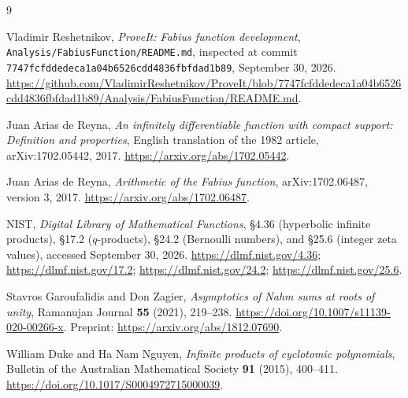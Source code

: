 \documentclass[11pt,a4paper]{article}
\numberwithin{equation}{section}
\theoremstyle{definition}
\theoremstyle{remark}
\begin{document}
\clearpage
\begin{thebibliography}{9}
\raggedright
{}
Vladimir Reshetnikov, \emph{ProveIt: Fabius function development},
\texttt{Analysis/FabiusFunction/README.md}, inspected at commit
\texttt{7747fcfddedeca1a04b6526cdd4836fbfdad1b89}, September 30, 2026.
\url{https://github.com/VladimirReshetnikov/ProveIt/blob/7747fcfddedeca1a04b6526cdd4836fbfdad1b89/Analysis/FabiusFunction/README.md}.

Juan Arias de Reyna, \emph{An infinitely differentiable function with compact support: Definition and properties}, English translation of the 1982 article, arXiv:1702.05442, 2017.
\url{https://arxiv.org/abs/1702.05442}.

Juan Arias de Reyna, \emph{Arithmetic of the Fabius function},
arXiv:1702.06487, version 3, 2017.
\url{https://arxiv.org/abs/1702.06487}.

NIST, \emph{Digital Library of Mathematical Functions},
\S4.36 (hyperbolic infinite products), \S17.2 (\(q\)-products),
\S24.2 (Bernoulli numbers), and \S25.6 (integer zeta values), accessed September 30, 2026.
\url{https://dlmf.nist.gov/4.36}; \url{https://dlmf.nist.gov/17.2};
\url{https://dlmf.nist.gov/24.2}; \url{https://dlmf.nist.gov/25.6}.

Stavros Garoufalidis and Don Zagier,
\emph{Asymptotics of Nahm sums at roots of unity},
Ramanujan Journal \textbf{55} (2021), 219--238.
\url{https://doi.org/10.1007/s11139-020-00266-x}.
Preprint: \url{https://arxiv.org/abs/1812.07690}.

William Duke and Ha Nam Nguyen,
\emph{Infinite products of cyclotomic polynomials},
Bulletin of the Australian Mathematical Society \textbf{91} (2015), 400--411.
\url{https://doi.org/10.1017/S0004972715000039}.
\end{thebibliography}
\end{document}
